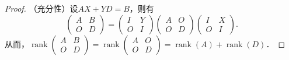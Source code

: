\documentclass[a4paper,fontset=windows]{ctexbook}
\theoremstyle{definition}
\DeclareMathOperator{\rank}{rank}
\begin{document}
\begin{proof}
（充分性）设$AX+YD=B$，则有
$$\begin{pmatrix}A&B \\ O&D\end{pmatrix}=\begin{pmatrix}I&Y \\ O&I\end{pmatrix}\begin{pmatrix}A&O \\ O&D\end{pmatrix}\begin{pmatrix}I&X \\ O&I\end{pmatrix}.$$
从而，$\rank\begin{pmatrix}A&B \\ O&D\end{pmatrix}=\rank\begin{pmatrix}A&O \\ O&D\end{pmatrix}=\rank(A)+\rank(D)$．


\end{proof}
\end{document}
